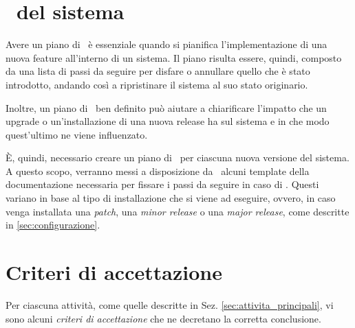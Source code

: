 \section{\rollback~del sistema}


	Avere un piano di \rollback~è essenziale quando si pianifica l'implementazione di una nuova feature all'interno di un sistema.
	Il piano risulta essere, quindi, composto da una lista di passi da seguire per disfare o annullare quello che è stato introdotto, andando così a ripristinare il sistema al suo stato originario.
	
	Inoltre, un piano di \rollback~ben definito può aiutare a chiarificare l'impatto che un upgrade o un'installazione di una nuova release ha sul sistema e in che modo quest'ultimo ne viene influenzato.

	È, quindi, necessario creare un piano di \rollback~per ciascuna nuova versione del sistema.
	A questo scopo, verranno messi a disposizione da \azienda~alcuni template della documentazione necessaria per fissare i passi da seguire in caso di \rollback.
	Questi variano in base al tipo di installazione che si viene ad eseguire, ovvero, in caso venga installata una \textit{patch}, una \textit{minor release} o una \textit{major release}, come descritte in \ref{sec:configurazione}.

\section{Criteri di accettazione}

	Per ciascuna attività, come quelle descritte in Sez. \ref{sec:attivita_principali}, vi sono alcuni \textit{criteri di accettazione} che ne decretano la corretta conclusione.

